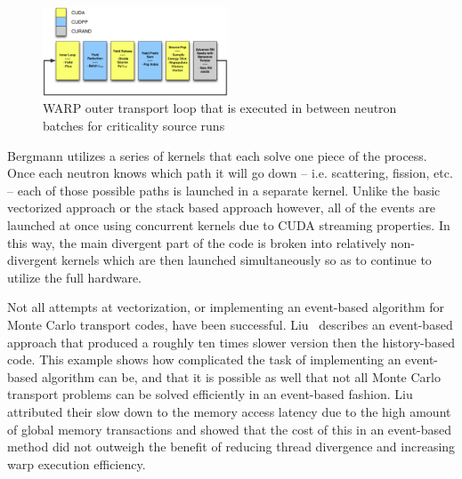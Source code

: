 \begin{figure}
\includegraphics[width=0.49\textwidth]{OuterLoopWARP}
\caption{WARP outer transport loop that is executed in between neutron batches for criticality source runs~\cite{2014development}}
\label{fig:outerLoopWARP}
\end{figure}

Bergmann utilizes a series of kernels that each solve one piece of the process.
%
Once each neutron knows which path it will go down -- i.e. scattering, fission, etc. -- each of those possible paths is launched in a separate kernel.
%
Unlike the basic vectorized approach or the stack based approach however, all of the events are launched at once using concurrent kernels due to CUDA streaming properties.
%
In this way, the main divergent part of the code is broken into relatively non-divergent kernels which are then launched simultaneously so as to continue to utilize the full hardware.

Not all attempts at vectorization, or implementing an event-based algorithm for Monte Carlo transport codes, have been successful.
%
Liu~\cite{liu2014comparative} describes an event-based approach that produced a roughly ten times slower version then the history-based code.
%
This example shows how complicated the task of implementing an event-based algorithm can be, and that it is possible as well that not all Monte Carlo transport problems can be solved efficiently in an event-based fashion.
%
Liu attributed their slow down to the memory access latency due to the high amount of global memory transactions and showed that the cost of this in an event-based method did not outweigh the benefit of reducing thread divergence and increasing warp execution efficiency.





